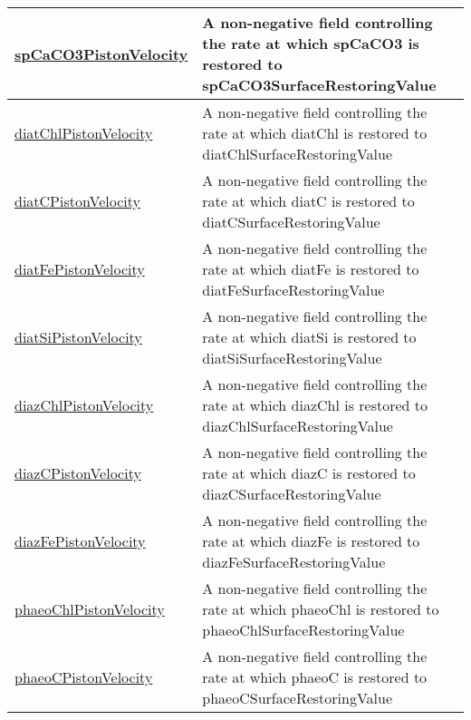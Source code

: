 {\begin{center}
\begin{longtable}{| p{2.0in} | p{4.0in} |}
    \hline
    \hyperref[subsec:var_sec_tracersSurfaceRestoringFields_spCaCO3PistonVelocity]{spCaCO3PistonVelocity} & A non-negative field controlling the rate at which spCaCO3 is restored to spCaCO3SurfaceRestoringValue \\
    \hline
    \hyperref[subsec:var_sec_tracersSurfaceRestoringFields_diatChlPistonVelocity]{diatChlPistonVelocity} & A non-negative field controlling the rate at which diatChl is restored to diatChlSurfaceRestoringValue \\
    \hline
    \hyperref[subsec:var_sec_tracersSurfaceRestoringFields_diatCPistonVelocity]{diatCPistonVelocity} & A non-negative field controlling the rate at which diatC is restored to diatCSurfaceRestoringValue \\
    \hline
    \hyperref[subsec:var_sec_tracersSurfaceRestoringFields_diatFePistonVelocity]{diatFePistonVelocity} & A non-negative field controlling the rate at which diatFe is restored to diatFeSurfaceRestoringValue \\
    \hline
    \hyperref[subsec:var_sec_tracersSurfaceRestoringFields_diatSiPistonVelocity]{diatSiPistonVelocity} & A non-negative field controlling the rate at which diatSi is restored to diatSiSurfaceRestoringValue \\
    \hline
    \hyperref[subsec:var_sec_tracersSurfaceRestoringFields_diazChlPistonVelocity]{diazChlPistonVelocity} & A non-negative field controlling the rate at which diazChl is restored to diazChlSurfaceRestoringValue \\
    \hline
    \hyperref[subsec:var_sec_tracersSurfaceRestoringFields_diazCPistonVelocity]{diazCPistonVelocity} & A non-negative field controlling the rate at which diazC is restored to diazCSurfaceRestoringValue \\
    \hline
    \hyperref[subsec:var_sec_tracersSurfaceRestoringFields_diazFePistonVelocity]{diazFePistonVelocity} & A non-negative field controlling the rate at which diazFe is restored to diazFeSurfaceRestoringValue \\
    \hline
    \hyperref[subsec:var_sec_tracersSurfaceRestoringFields_phaeoChlPistonVelocity]{phaeoChlPistonVelocity} & A non-negative field controlling the rate at which phaeoChl is restored to phaeoChlSurfaceRestoringValue \\
    \hline
    \hyperref[subsec:var_sec_tracersSurfaceRestoringFields_phaeoCPistonVelocity]{phaeoCPistonVelocity} & A non-negative field controlling the rate at which phaeoC is restored to phaeoCSurfaceRestoringValue \\

\end{longtable}
\end{center}}
